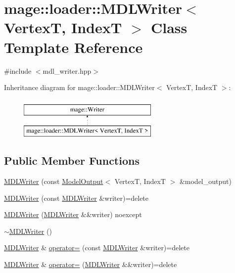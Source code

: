 \hypertarget{classmage_1_1loader_1_1_m_d_l_writer}{}\section{mage\+:\+:loader\+:\+:M\+D\+L\+Writer$<$ VertexT, IndexT $>$ Class Template Reference}
\label{classmage_1_1loader_1_1_m_d_l_writer}


{\ttfamily \#include $<$mdl\+\_\+writer.\+hpp$>$}

Inheritance diagram for mage\+:\+:loader\+:\+:M\+D\+L\+Writer$<$ VertexT, IndexT $>$\+:\begin{figure}[H]
\begin{center}
\leavevmode
\includegraphics[height=2.000000cm]{classmage_1_1loader_1_1_m_d_l_writer}
\end{center}
\end{figure}
\subsection*{Public Member Functions}
\begin{DoxyCompactItemize}
\item 
\hyperlink{classmage_1_1loader_1_1_m_d_l_writer_a09d15b2ee7bedbbda744b9866c2392c6}{M\+D\+L\+Writer} (const \hyperlink{structmage_1_1_model_output}{Model\+Output}$<$ VertexT, IndexT $>$ \&model\+\_\+output)
\item 
\hyperlink{classmage_1_1loader_1_1_m_d_l_writer_a2c63abb8bf2861f52715ab8ad495038e}{M\+D\+L\+Writer} (const \hyperlink{classmage_1_1loader_1_1_m_d_l_writer}{M\+D\+L\+Writer} \&writer)=delete
\item 
\hyperlink{classmage_1_1loader_1_1_m_d_l_writer_a0a75a99bc24a940df08a9b573bf4a61b}{M\+D\+L\+Writer} (\hyperlink{classmage_1_1loader_1_1_m_d_l_writer}{M\+D\+L\+Writer} \&\&writer) noexcept
\item 
\hyperlink{classmage_1_1loader_1_1_m_d_l_writer_a4697f6802827fb51ac620084b45466da}{$\sim$\+M\+D\+L\+Writer} ()
\item 
\hyperlink{classmage_1_1loader_1_1_m_d_l_writer}{M\+D\+L\+Writer} \& \hyperlink{classmage_1_1loader_1_1_m_d_l_writer_abeb16a16698c5c3dde9da9b39be74269}{operator=} (const \hyperlink{classmage_1_1loader_1_1_m_d_l_writer}{M\+D\+L\+Writer} \&writer)=delete
\item 
\hyperlink{classmage_1_1loader_1_1_m_d_l_writer}{M\+D\+L\+Writer} \& \hyperlink{classmage_1_1loader_1_1_m_d_l_writer_a4f82a805a9fb84d3cb6a3b63abae1b99}{operator=} (\hyperlink{classmage_1_1loader_1_1_m_d_l_writer}{M\+D\+L\+Writer} \&\&writer)=delete
\end{DoxyCompactItemize}
